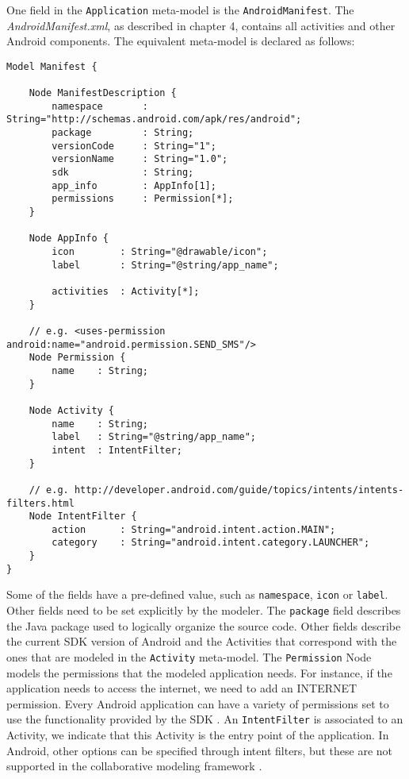 One field in the \texttt{Application} meta-model is the \texttt{AndroidManifest}. The \textit{AndroidManifest.xml}, as described in chapter 4, contains all activities and other Android components. The equivalent meta-model is declared as follows:

\begin{lstlisting}[label=application-mm,caption=Manifest meta-model, captionpos=t]
Model Manifest {

	Node ManifestDescription {
		namespace		: String="http://schemas.android.com/apk/res/android";
		package			: String;
		versionCode		: String="1";
		versionName		: String="1.0";
		sdk				: String;
		app_info		: AppInfo[1];
		permissions		: Permission[*];
	}

	Node AppInfo {
		icon 		: String="@drawable/icon";
		label		: String="@string/app_name";

		activities	: Activity[*];
	}

	// e.g. <uses-permission android:name="android.permission.SEND_SMS"/>
	Node Permission {
		name 	: String;
	}

	Node Activity {
		name 	: String;
		label 	: String="@string/app_name";
		intent	: IntentFilter;
	}

	// e.g. http://developer.android.com/guide/topics/intents/intents-filters.html
	Node IntentFilter {
		action 		: String="android.intent.action.MAIN";
		category	: String="android.intent.category.LAUNCHER";
	}
}
\end{lstlisting}
Some of the fields have a pre-defined value, such as \texttt{namespace}, \texttt{icon} or \texttt{label}. Other fields need to be set explicitly by the modeler. The \texttt{package} field describes the Java package used to logically organize the source code. Other fields describe the current SDK version of Android and the Activities that correspond with the ones that are modeled in the \texttt{Activity} meta-model. The \texttt{Permission} Node models the permissions that the modeled application needs. For instance, if the application needs to access the internet, we need to add an INTERNET permission. Every Android application can have a variety of permissions set to use the functionality provided by the SDK \cite{AndroidPermissions}. An \texttt{IntentFilter} is associated to an Activity, we indicate that this Activity is the entry point of the application. In Android, other options can be specified through intent filters, but these are not supported in the collaborative modeling framework \cite{AndroidIntentFilter}.

